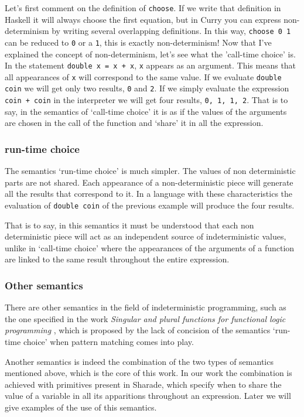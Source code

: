 \documentclass[class=article, crop=false]{standalone}
\begin{document}
Let's first comment on the definition of \verb`choose`. If we write that definition in
Haskell it will always choose the first equation, but in Curry you can express
non-determinism by writing several overlapping definitions. In this way, \verb`choose 0 1`
can be reduced to \verb`0` or a \verb`1`, this is exactly non-determinism! Now that
I've explained the concept of non-determinism, let's see what the 'call-time choice' is. In
the statement \verb`double x = x + x`, \verb`x` appears as an argument. This means that all
appearances of \verb`x` will correspond to the same value. If we evaluate \verb`double coin`
we will get only two results, \verb`0` and \verb`2`. If we simply evaluate the expression 
\verb`coin + coin` in the interpreter we will get four results, \verb`0, 1, 1, 2`. That is to
say, in the semantics of `call-time choice' it is as if the values of the arguments are
chosen in the call of the function and `share' it in all the expression.

\subsubsection{run-time choice}
The semantics `run-time choice' is much simpler. The values of non deterministic parts are
not shared. Each appearance of a non-deterministic piece will generate all the results that
correspond to it. In a language with these characteristics the evaluation of
\verb`double coin` of the previous example will produce the four results.

That is to say, in this semantics it must be understood that each non deterministic piece
will act as an independent source of indeterministic values, unlike in `call-time choice'
where the appearances of the arguments of a function are linked to the same result throughout
the entire expression.

\subsubsection{Other semantics}
There are other semantics in the field of indeterministic programming, such as the one
specified in the work \textit{Singular and plural functions for functional logic programming}
\cite{riesco2014singular}, which is proposed by the lack of concision of the semantics
`run-time choice' when pattern matching comes into play.

Another semantics is indeed the combination of the two types of semantics mentioned above,
which is the core of this work. In our work the combination is achieved with primitives
present in Sharade, which specify when to share the value of a variable in all its
apparitions throughout an expression. Later we will give examples of the use of this
semantics.
\end{document}
